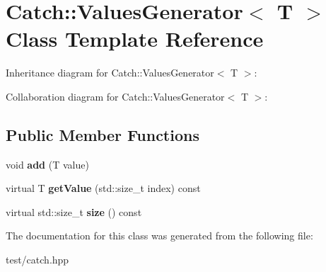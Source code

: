 \hypertarget{classCatch_1_1ValuesGenerator}{}\section{Catch\+:\+:Values\+Generator$<$ T $>$ Class Template Reference}
\label{classCatch_1_1ValuesGenerator}


Inheritance diagram for Catch\+:\+:Values\+Generator$<$ T $>$\+:


Collaboration diagram for Catch\+:\+:Values\+Generator$<$ T $>$\+:
\subsection*{Public Member Functions}
\begin{DoxyCompactItemize}
\item 
void {\bfseries add} (T value)\hypertarget{classCatch_1_1ValuesGenerator_a8412c8ce5d9d4fc6ff06d5246d56d538}{}\label{classCatch_1_1ValuesGenerator_a8412c8ce5d9d4fc6ff06d5246d56d538}

\item 
virtual T {\bfseries get\+Value} (std\+::size\+\_\+t index) const \hypertarget{classCatch_1_1ValuesGenerator_a60599dd67096ff108471f64ee42acd9d}{}\label{classCatch_1_1ValuesGenerator_a60599dd67096ff108471f64ee42acd9d}

\item 
virtual std\+::size\+\_\+t {\bfseries size} () const \hypertarget{classCatch_1_1ValuesGenerator_a98a80bb0dd682c44e82e4a75e98c4682}{}\label{classCatch_1_1ValuesGenerator_a98a80bb0dd682c44e82e4a75e98c4682}

\end{DoxyCompactItemize}


The documentation for this class was generated from the following file\+:\begin{DoxyCompactItemize}
\item 
test/catch.\+hpp\end{DoxyCompactItemize}
